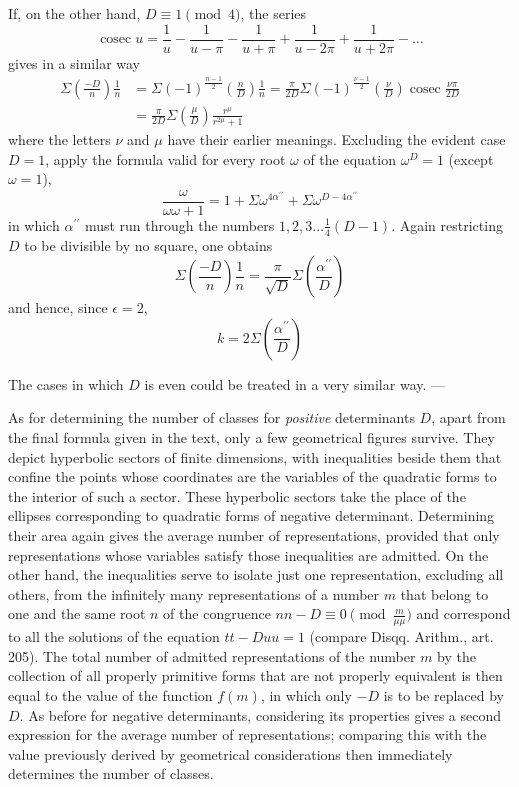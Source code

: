 If, on the other hand, $D\equiv1\pmod4$, the series
\[
\operatorname{cosec}u=\frac1u-\frac1{u-\pi}-\frac1{u+\pi}+\frac1{u-2\pi}+\frac1{u+2\pi}-\ldots
\]
gives in a similar way
\[
\begin{aligned}
\Sigma\left(\frac{-D}n\right)\frac1n&=\Sigma(-1)^{\frac{n-1}2}\left(\frac nD\right)\frac1n
=\frac\pi{2D}\Sigma(-1)^{\frac{\nu-1}2}\left(\frac\nu D\right)\operatorname{cosec}\frac{\nu\pi}{2D}\\
&=\frac\pi{2D}\Sigma\left(\frac\mu D\right)\frac{r^\mu}{r^{2\mu}+1}
\end{aligned}
\]
where the letters $\nu$ and $\mu$ have their earlier meanings. Excluding the evident case $D=1$, apply the formula valid for every root $\omega$ of the equation $\omega^D=1$ (except $\omega=1$),
\[
\frac\omega{\omega\omega+1}=1+\Sigma\omega^{4\alpha^{\prime\prime}}+\Sigma\omega^{D-4\alpha^{\prime\prime}}
\]
in which $\alpha^{\prime\prime}$ must run through the numbers $1,2,3\ldots\frac14(D-1)$. Again restricting $D$ to be divisible by no square, one obtains
\[
\Sigma\left(\frac{-D}n\right)\frac1n=\frac\pi{\surd D}\Sigma\left(\frac{\alpha^{\prime\prime}}D\right)
\]
and hence, since $\epsilon=2$,
\[
k=2\Sigma\left(\frac{\alpha^{\prime\prime}}D\right)
\]

The cases in which $D$ is even could be treated in a very similar way. —

As for determining the number of classes for \emph{positive} determinants $D$, apart from the final formula given in the text, only a few geometrical figures survive. They depict hyperbolic sectors of finite dimensions, with inequalities beside them that confine the points whose coordinates are the variables of the quadratic forms to the interior of such a sector. These hyperbolic sectors take the place of the ellipses corresponding to quadratic forms of negative determinant. Determining their area again gives the average number of representations, provided that only representations whose variables satisfy those inequalities are admitted. On the other hand, the inequalities serve to isolate just one representation, excluding all others, from the infinitely many representations of a number $m$ that belong to one and the same root $n$ of the congruence $nn-D\equiv0\pmod{\frac m{\mu\mu}}$ and correspond to all the solutions of the equation $tt-Duu=1$ (compare Disqq. Arithm., art. 205). The total number of admitted representations of the number $m$ by the collection of all properly primitive forms that are not properly equivalent is then equal to the value of the function $f(m)$, in which only $-D$ is to be replaced by $D$. As before for negative determinants, considering its properties gives a second expression for the average number of representations; comparing this with the value previously derived by geometrical considerations then immediately determines the number of classes.
\BookRule{35mm}

